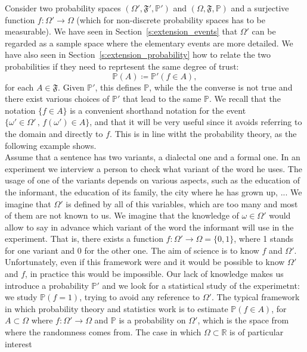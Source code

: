 Consider two probability spaces $(\Omega',\mathfrak F',  \mathbb P')$ and $(\Omega, \mathfrak F, \mathbb P)$ and a surjective function $f:\Omega' \to \Omega$ (which for non-discrete probability spaces has to be measurable). We have seen in Section~\eqref{s:extension_events} that $\Omega'$ can be regarded as a sample space where the elementary events are more detailed. We have also seen in Section~\eqref{s:extension_probability} how to relate the two probabilities if they need to reprtesent the same degree of trust: 
	\begin{equation}
		\label{e:push_forward}
		\mathbb P(A) \coloneqq \mathbb P'( f \in A ),
	\end{equation}
for each $A \in \mathfrak F$. Given $\mathbb P'$, this defines $\mathbb P$, while the the converse is not true and there exist various choices of $\mathbb P'$ that lead to the same $\mathbb P$. We recall that the notation $ \{ f \in A\}$  is a convenient shorthand notation for the event $\{ \omega' \in \Omega' \,,\, f(\omega' ) \in A\}$, and that it will be very useful since it avoids referring to the domain and directly to $f$. This is in line witht the probability theory, as the following example shows.\\
Assume that a sentence has two variants, a dialectal one and a formal one. In an experiment we interview a person to check what variant of the word he uses. The usage of one of the variants depends on various aspects, such as the education of the informant, the education of its family, the city where he has grown up, ... We imagine that $\Omega'$ is defined by all of this variables, which are too many and most of them are not known to us. We imagine that the knowledge of $\omega \in \Omega'$ would allow to say in advance which variant of the word the informant will use in the experiment. That is, there exists a function $f:\Omega' \to \Omega  = \{0,1\}$, where 1 stands for one variant and 0 for the other one. The aim of science is to know $f$ and $\Omega'$. Unfortunately, even if this framework  were and it would be possible to know $\Omega'$ and $f$, in practice this would be impossible. Our lack of knowledge makes us introduce a probability $\mathbb P'$ and we look for a statistical study of the experimetnt: we study $\mathbb P(f = 1)$, trying to avoid any reference to $\Omega'$.   
The typical framework in which probability theory and statistics work is to estimate $\mathbb P(f \in A)$, for $A\subset\Omega$ where $f:\Omega'\to \Omega$ and $\mathbb P$ is a probability on $\Omega'$, which is the space from where the randomness comes from. The case in which $\Omega \subset \mathbb R$ is of particular interest 
	
